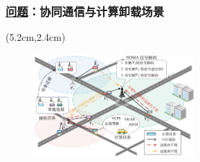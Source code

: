 \begin{frame}
\frametitle{\englishfont \underline{问题}：协同通信与计算卸载场景}
\newBackground
\begin{center}
\begin{textblock*}{\textwidth}(5.2cm,2.4cm)
\begin{figure}
\includegraphics[width=0.55\textwidth]{fig/Fig3-1-noma-architecture.pdf}
\end{figure}
\end{textblock*}
\end{center}


\end{frame}
